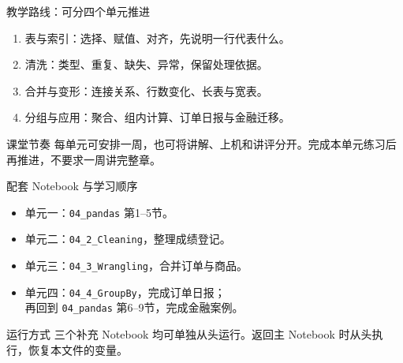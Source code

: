 \begin{frame}{教学路线：可分四个单元推进}
\begin{enumerate}
\item 表与索引：选择、赋值、对齐，先说明一行代表什么。
\item 清洗：类型、重复、缺失、异常，保留处理依据。
\item 合并与变形：连接关系、行数变化、长表与宽表。
\item 分组与应用：聚合、组内计算、订单日报与金融迁移。
\end{enumerate}
\begin{block}{课堂节奏}
每单元可安排一周，也可将讲解、上机和讲评分开。完成本单元练习后再推进，不要求一周讲完整章。
\end{block}
\end{frame}
\begin{frame}{配套 Notebook 与学习顺序}
\begin{itemize}
\item 单元一：\texttt{04\_pandas} 第1--5节。
\item 单元二：\texttt{04\_2\_Cleaning}，整理成绩登记。
\item 单元三：\texttt{04\_3\_Wrangling}，合并订单与商品。
\item 单元四：\texttt{04\_4\_GroupBy}，完成订单日报；\\
再回到 \texttt{04\_pandas} 第6--9节，完成金融案例。
\end{itemize}
\begin{block}{运行方式}
三个补充 Notebook 均可单独从头运行。返回主 Notebook 时从头执行，恢复本文件的变量。
\end{block}
\end{frame}
